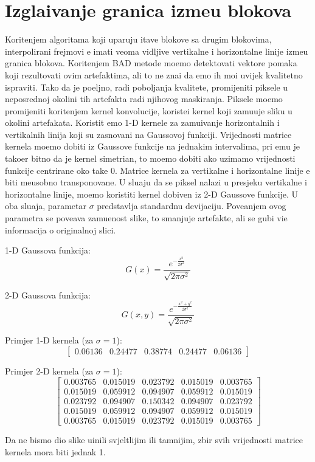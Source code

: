 \section{Izgla\dj ivanje granica izme\dj u blokova}
Kori\sh tenjem algoritama koji uparuju \ch itave blokove sa drugim blokovima, interpolirani frejmovi \cj e imati veoma vidljive vertikalne i horizontalne linije izme\dj u granica blokova. Kori\sh tenjem BAD metode mo\zh emo detektovati vektore
pomaka koji \cj rezultovati ovim artefaktima, ali to ne zna\ch i da \cj emo ih mo\cj i uvijek kvalitetno ispraviti. Tako da je po\zh eljno, radi pobolj\sh anja kvalitete, promijeniti piksele u neposrednoj okolini tih artefakta radi njihovog maskiranja.
Piksele mo\zh emo promijeniti kori\sh tenjem kernel konvolucije, koriste\cj i kernel koji zamu\cj uje sliku u okolini artefakata. Koristit \cj emo 1-D kernele za zamu\cj ivanje horizontalnih i vertikalnih linija koji su zasnovani na Gaussovoj funkciji.
Vrijednosti matrice kernela mo\zh emo dobiti iz Gaussove funkcije na jednakim intervalima, pri \ch emu je tako\dj er bitno da je kernel simetri\ch an, \sh to mo\zh emo dobiti ako uzimamo vrijednosti funkcije centrirane oko ta\ch ke 0.
Matrice kernela za vertikalne i horizontalne linije \cj e biti me\dj usobno transponovane. U slu\ch aju da se piksel nalazi u presjeku vertikalne i horizontalne linije, mo\zh emo koristiti kernel dobiven iz 2-D Gaussove funkcije. U oba slu\ch aja,
parametar $\sigma$ predstavlja standardnu devijaciju. Pove\cj anjem ovog parametra se pove\cj ava zamu\cj enost slike, \sh to smanjuje artefakte, ali se gubi vi\sh e informacija o originalnoj slici.

1-D Gaussova funkcija:
\[
G(x)=\frac{e^{-\frac{x^2}{2\sigma^2}}}{\sqrt{2\pi\sigma^2}}
\]

2-D Gaussova funkcija:
\[
G(x,y)=\frac{e^{-\frac{x^2+y^2}{2\sigma^2}}}{\sqrt{2\pi\sigma^2}}
\]

Primjer 1-D kernela (za $\sigma=1$):
\[
\begin{bmatrix}
0.06136 & 0.24477 & 0.38774 & 0.24477 & 0.06136
\end{bmatrix}
\]

Primjer 2-D kernela (za $\sigma=1$):
\[
\begin{bmatrix}
0.003765 & 0.015019 & 0.023792 & 0.015019 & 0.003765 \\
0.015019 & 0.059912 & 0.094907 & 0.059912 & 0.015019 \\
0.023792 & 0.094907 & 0.150342 & 0.094907 & 0.023792 \\
0.015019 & 0.059912 & 0.094907 & 0.059912 & 0.015019 \\
0.003765 & 0.015019 & 0.023792 & 0.015019 & 0.003765
\end{bmatrix}
\]

Da ne bismo dio slike u\ch inili svjeltlijim ili tamnijim, zbir svih vrijednosti matrice kernela mora biti jednak 1.
